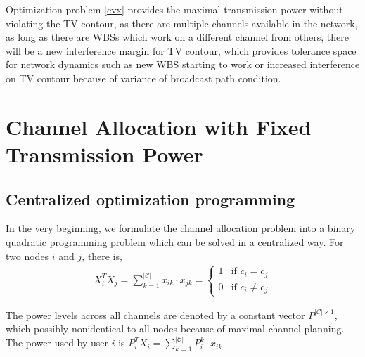 Optimization problem \ref{cvx} provides the maximal transmission power without violating the TV contour, as there are multiple channels available in the network, as long as there are WBSs which work on a different channel from others, there will be a new interference margin for TV contour, which provides tolerance space for network dynamics such as new WBS starting to work or increased interference on TV contour because of variance of broadcast path condition. 


\section{Channel Allocation with Fixed Transmission Power}
\label{CA_fixedPower_2subproblem}
\subsection{Centralized optimization programming}
In the very beginning, we formulate the channel allocation problem into a binary quadratic programming problem which can be solved in a centralized way.  For two nodes $i$ and $j$, there is,
\begin{equation}
\begin{split}
X_i^TX_j = \sum\limits_{k=1}^{|\mathcal{C}|}x_{ik}\cdot x_{jk} = 
\left\{ \begin{array}{ll}
1 & \mbox{if $c_i=c_j$} \\
0 & \mbox{if $c_i\neq c_j$} 
\end{array}
\right.
\end{split}
\end{equation}

The power levels across all channels are denoted by a constant vector $P^{|\mathcal{C}|\times 1}$, which possibly nonidentical to all nodes because of maximal channel planning. The power used by user $i$ is $P_i^TX_i = \sum\limits_{k=1}^{|\mathcal{C}|}P_{i}^k\cdot x_{ik}$.


